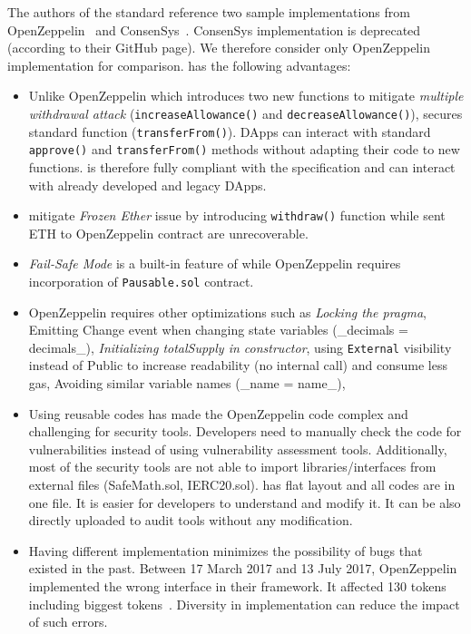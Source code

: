 {The authors of the \erc standard reference two sample implementations from OpenZeppelin~\cite{OpenZepplin} and ConsenSys~\cite{ConsensysToken}. ConsenSys implementation is deprecated (according to their GitHub page). We therefore consider only OpenZeppelin implementation for comparison. \sys has the following advantages:
\begin{itemize}[noitemsep,topsep=0pt]
	\item Unlike OpenZeppelin which introduces two new functions to mitigate \textit{multiple withdrawal attack} (\ie \texttt{increaseAllowance()} and \texttt{decreaseAllowance()}), \sys secures standard \erc function (\ie \texttt{transferFrom()}). DApps can interact with standard \texttt{approve()} and \texttt{transferFrom()} methods without adapting their code to new functions. \sys is therefore fully compliant with the \erc specification and can interact with already developed and legacy DApps.
	\item \sys mitigate \textit{Frozen Ether} issue by introducing \texttt{withdraw()} function while sent ETH to OpenZeppelin contract are unrecoverable.
	\item \textit{Fail-Safe Mode} is a built-in feature of \sys while OpenZeppelin requires incorporation of \texttt{Pausable.sol} contract.
	\item OpenZeppelin requires other optimizations such as \textit{Locking the pragma}, Emitting Change event when changing state variables (\eg \_decimals = decimals\_), \textit{Initializing totalSupply in constructor}, using \texttt{External} visibility instead of Public to increase readability (\ie no internal call) and consume less gas, Avoiding similar variable names (\eg \_name = name\_), \etc
	\item Using reusable codes has made the OpenZeppelin code complex and challenging for security tools. Developers need to manually check the code for vulnerabilities instead of using vulnerability assessment tools. Additionally, most of the security tools are not able to import libraries/interfaces from external files (\eg SafeMath.sol, IERC20.sol). \sys has flat layout and all codes are in one file. It is easier for developers to understand and modify it. It can be also directly uploaded to audit tools without any modification.
	\item Having different \erc implementation minimizes the possibility of bugs that existed in the past. Between 17 March 2017 and 13 July 2017, OpenZeppelin implemented the wrong interface in their framework. It affected 130 tokens including biggest tokens~\cite{ErcBug}. Diversity in \erc implementation can reduce the impact of such errors.
\end{itemize}
}

